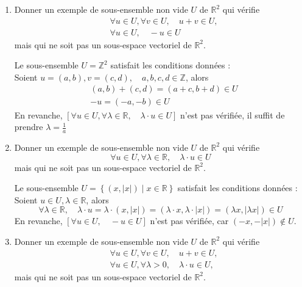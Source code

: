 \documentclass[a4paper, 10pt]{report}
\providecommand{\abs}[1]{\lvert#1\rvert}
\begin{document}
	\begin{enumerate}[label=\arabic*.]
		\item Donner un exemple de sous-ensemble non vide $U$ de
		$\mathbb{R}^2$ qui vérifie
		\[\begin{split}
			&\forall u \in U, \forall v \in U, \quad u + v \in U,\\
			&\forall u \in U, \quad -u \in U
		\end{split}\]
		mais qui ne soit pas un sous-espace vectoriel de $\mathbb{R}^2$.
		
		\colorbox{solution}
		{
			\begin{minipage}{0.9\textwidth}
				Le sous-ensemble $U = \mathbb{Z}^2$ satisfait les
				conditions données :\\
				Soient $u = (a, b), v = (c, d),
					\quad a, b, c, d \in \mathbb{Z}$, alors
				\[\begin{split}
					&(a, b) + (c, d) = (a+c, b+d) \in U\\
					&-u = (-a, -b) \in U
				\end{split}\]
				En revanche, $[\forall u \in U,
					\forall \lambda \in \mathbb{R}, \quad
					\lambda \cdot u \in U]$ n'est pas vérifiée,
				il suffit de prendre $\lambda = \frac{1}{a}$
			\end{minipage}
		}
		\item Donner un exemple de sous-ensemble non vide $U$ de
		$\mathbb{R}^2$ qui vérifie
		\[
			\forall u \in U, \forall \lambda \in \mathbb{R}, \quad
				\lambda \cdot u \in U
		\]
		mais qui ne soit pas un sous-espace vectoriel de $\mathbb{R}^2$.
		
		\colorbox{solution}
		{
			\begin{minipage}{0.9\textwidth}
				Le sous-ensemble $U = \left\{(x, \abs{x}) \mid 
					x \in \mathbb{R} \right\}$ satisfait les
				conditions données :\\
				Soient $u \in U, \lambda \in \mathbb{R}$, alors
				\[
					\forall \lambda \in \mathbb{R}, \quad
						\lambda \cdot u = \lambda \cdot (x, \abs{x})
						= (\lambda \cdot x, \lambda \cdot \abs{x})
						= (\lambda x, \abs{\lambda x}) \in U
				\]
				En revanche, $[\forall u \in U, \quad -u \in U]$ n'est
				pas vérifiée, car $(-x, -\abs{x}) \notin U$.
			\end{minipage}
		}
		\item Donner un exemple de sous-ensemble non vide $U$ de
		$\mathbb{R}^2$ qui vérifie
		\[\begin{split}
			&\forall u \in U, \forall v \in U, \quad u + v \in U,\\
			&\forall u \in U, \forall \lambda > 0, \quad
				\lambda \cdot u \in U,
		\end{split}\]
		mais qui ne soit pas un sous-espace vectoriel de $\mathbb{R}^2$.
		

\end{enumerate}
\end{document}
